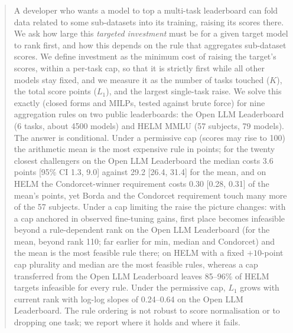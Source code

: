 \begin{abstract}
A developer who wants a model to top a multi-task leaderboard can fold data related to some sub-datasets into its training, raising its scores there.
We ask how large this \emph{targeted investment} must be for a given target model to rank first, and how this depends on the rule that aggregates sub-dataset scores.
We define investment as the minimum cost of raising the target's scores, within a per-task cap, so that it is strictly first while all other models stay fixed, and we measure it as the number of tasks touched ($K$), the total score points ($L_1$), and the largest single-task raise.
We solve this exactly (closed forms and MILPs, tested against brute force) for nine aggregation rules on two public leaderboards: the Open LLM Leaderboard (6 tasks, about 4500 models) and HELM MMLU (57 subjects, 79 models).
The answer is conditional.
Under a permissive cap (scores may rise to 100) the arithmetic mean is the most expensive rule in points; for the twenty closest challengers on the Open LLM Leaderboard the median costs 3.6 points [95\% CI 1.3, 9.0] against 29.2 [26.4, 31.4] for the mean, and on HELM the Condorcet-winner requirement costs 0.30 [0.28, 0.31] of the mean's points, yet Borda and the Condorcet requirement touch many more of the 57 subjects.
Under a cap limiting the raise the picture changes: with a cap anchored in observed fine-tuning gains, first place becomes infeasible beyond a rule-dependent rank on the Open LLM Leaderboard (for the mean, beyond rank 110; far earlier for min, median and Condorcet) and the mean is the most feasible rule there; on HELM with a fixed $+10$-point cap plurality and median are the most feasible rules, whereas a cap transferred from the Open LLM Leaderboard leaves 85--96\% of HELM targets infeasible for every rule.
Under the permissive cap, $L_1$ grows with current rank with log-log slopes of 0.24--0.64 on the Open LLM Leaderboard.
The rule ordering is not robust to score normalisation or to dropping one task; we report where it holds and where it fails.
\end{abstract}
